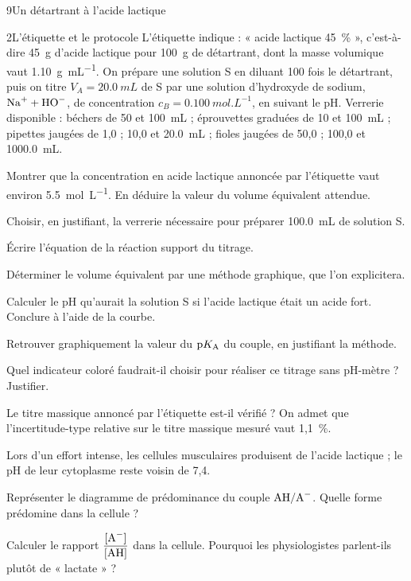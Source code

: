 \begin{exoBac}{9}{Un détartrant à l'acide lactique}
\begin{docu}{2}{L'étiquette et le protocole}
L'étiquette indique : « acide lactique 45~\% », c'est-à-dire 45~g d'acide lactique pour 100~g de détartrant, dont la masse
volumique vaut \qty{1,10}{g.mL^{-1}}. On prépare une solution S en diluant 100 fois le détartrant, puis on titre $V_A=\qty{20,0}{mL}$
de S par une solution d'hydroxyde de sodium, $\ce{Na+}+\ce{HO-}$, de concentration $c_B=\qty{0,100}{mol.L^{-1}}$, en suivant le pH.
Verrerie disponible : béchers de 50 et \qty{100}{mL} ; éprouvettes graduées de 10 et \qty{100}{mL} ; pipettes jaugées de 1,0 ; 10,0 et
\qty{20,0}{mL} ; fioles jaugées de 50,0 ; 100,0 et \qty{1000,0}{mL}.
\end{docu}
\begin{questions}[resume]
\item Montrer que la concentration en acide lactique annoncée par l'étiquette vaut environ \qty{5,5}{mol.L^{-1}}. En déduire
la valeur du volume équivalent attendue.
\item Choisir, en justifiant, la verrerie nécessaire pour préparer \qty{100,0}{mL} de solution S.
\item Écrire l'équation de la réaction support du titrage.
\item Déterminer le volume équivalent par une méthode graphique, que l'on explicitera.
\item Calculer le pH qu'aurait la solution S si l'acide lactique était un acide fort. Conclure à l'aide de la courbe.
\item Retrouver graphiquement la valeur du $\mathrm{p}K_{\mathrm{A}}$ du couple, en justifiant la méthode.
\item Quel indicateur coloré faudrait-il choisir pour réaliser ce titrage sans pH-mètre ? Justifier.
\item \initiative Le titre massique annoncé par l'étiquette est-il vérifié ? On admet que l'incertitude-type relative sur le
titre massique mesuré vaut 1,1~\%.
\end{questions}

Lors d'un effort intense, les cellules musculaires produisent de l'acide lactique ; le pH de leur cytoplasme reste
voisin de 7,4.
\begin{questions}[resume]
\item Représenter le diagramme de prédominance du couple $\ce{AH}/\ce{A-}$. Quelle forme prédomine dans la cellule ?
\item Calculer le rapport $\dfrac{[\ce{A-}]}{[\ce{AH}]}$ dans la cellule. Pourquoi les physiologistes parlent-ils plutôt de « lactate » ?
\end{questions}
\end{exoBac}

